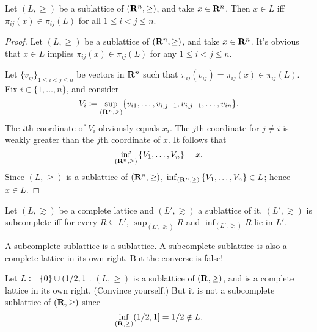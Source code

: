 \documentclass[11pt,letterpaper,reqno,oneside]{article}
\begin{document}
\begin{theorem}
	\label{theorem:sublattice_pairwise}
	Let $(L,\geq)$ be a sublattice of $\left(\mathbf{R}^n,\geq\right)$, and take $x \in \mathbf{R}^n$. Then $x \in L$ iff $\pi_{ij}(x) \in \pi_{ij}(L)$ for all $1 \leq i < j \leq n$.
\end{theorem}


\begin{proof}
	Let $(L,\geq)$ be a sublattice of $\left(\mathbf{R}^n,\geq\right)$, and take $x \in \mathbf{R}^n$. It's obvious that $x \in L$ implies $\pi_{ij}(x) \in \pi_{ij}(L)$ for any $1 \leq i < j \leq n$.

	Let $\{ v_{ij} \}_{1 \leq i < j \leq n}$ be vectors in $\mathbf{R}^n$ such that $\pi_{ij}(v_{ij})=\pi_{ij}(x) \in \pi_{ij}(L)$. Fix $i \in \{1,\dots,n\}$, and consider 
	\begin{equation*}
		V_i \coloneqq \sup_{(\mathbf{R}^n,\geq)} 
		\{ v_{i1},\dots,v_{i,j-1},v_{i,j+1},\dots,v_{in} \} .
	\end{equation*}
	The $i$th coordinate of $V_i$ obviously equals $x_i$. The $j$th coordinate for $j \neq i$ is weakly greater than the $j$th coordinate of $x$. It follows that
	\begin{equation*}
		\inf_{(\mathbf{R}^n,\geq)} \left\{ V_1,\dots,V_n \right\} = x .
	\end{equation*}
	Since $(L,\geq)$ is a sublattice of $\left(\mathbf{R}^n,\geq\right)$, $\inf_{(\mathbf{R}^n,\geq)} \left\{ V_1,\dots,V_n \right\} \in L$; hence $x \in L$.
\end{proof}


\begin{definition}
	Let $(L,\gtrsim)$ be a complete lattice and $(L',\gtrsim)$ a sublattice of it. $(L',\gtrsim)$ is subcomplete iff for every $R \subseteq L'$, $\sup_{(L',\gtrsim)} R$ and $\inf_{(L',\gtrsim)} R$ lie in $L'$.
\end{definition}

A subcomplete sublattice is a sublattice. A subcomplete sublattice is also a complete lattice in its own right. But the converse is false!
%
\begin{example}
	Let $L \coloneqq \{0\} \cup (1/2,1]$. $(L,\geq)$ is a sublattice of $(\mathbf{R},\geq)$, and is a complete lattice in its own right. (Convince yourself.) But it is not a subcomplete sublattice of $(\mathbf{R},\geq)$ since
	\begin{equation*}
		\inf_{(\mathbf{R},\geq)} (1/2,1] = 1/2 \notin L .
	\end{equation*}
\end{example}
\end{document}
